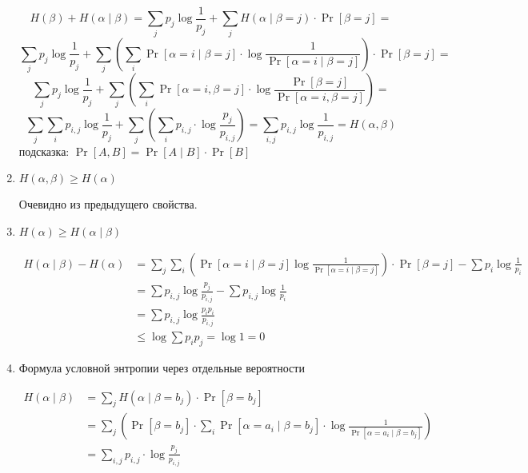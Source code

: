 \begin{prop}
\begin{enumerate}
\begin{proof*}
		    \[
    		    H( \beta ) + H( \alpha  \mid \beta ) = \sum_j p_j \log \frac{1}{p_j} + \sum_{j} H ( \alpha  \mid \beta = j) \cdot  \Pr[\beta = j] = \]\[ \sum_j p_j \log \frac{1}{p_j} + \sum_{j} \left(\sum_{i}^{} \Pr[ \alpha = i \mid  \beta  = j] \cdot  \log \frac{1}{\Pr [ \alpha  = i \mid \beta  = j]}\right) \cdot  \Pr[\beta = j] = 
		    \]
		    \[ 
		        \sum_j p_j \log \frac{1}{p_j} + \sum_{j} \left(\sum_{i}^{} \Pr[ \alpha = i,  \beta  = j] \cdot  \log \frac{\Pr [\beta = j]}{\Pr [ \alpha  = i,  \beta  = j]}\right) = 
		    \]
		     \[ 
		         \sum_j \sum_i p_{i,j} \log \frac{1}{p_j} + \sum_{j} \left(\sum_{i}^{} p_{i,j} \cdot  \log \frac{p_j}{p_{i,j}}\right) = \sum_{i,j}p_{i,j}\log \frac{1}{p_{i,j}} = H(\alpha, \beta)
		    \]
		    подсказка: $\Pr [A, B] = \Pr[A \mid B] \cdot \Pr[B]$
		\end{proof*}
		\item $ H( \alpha , \beta ) \ge H( \alpha )$
		\begin{proof*}
		    Очевидно из предыдущего свойства.
		\end{proof*}
		\item $ H( \alpha ) \ge  H ( \alpha \mid \beta )$
			\begin{proof*}
			    \begin{align*}
    			    H( \alpha \mid \beta ) - H ( \alpha ) 
    			    &= \sum_j \sum_i\left( \Pr [\alpha = i \mid \beta = j] \log \frac{1}{ \Pr [ \alpha = i \mid \beta = j]}\right)\cdot \Pr[\beta = j] - \sum p_{i} \log \frac{1}{p_i} \\
    				&= \sum p_{i,j}\log\frac{p_j}{p_{i,j}} - \sum p_{i,j}\log\frac{1}{p_i} \\
    				&= \sum p_{i, j} \log \frac{p_i p_i}{p_{i,j}} \\
    				&\le \log \sum p_i p_j = \log 1 = 0 \tag{по неравенству Йенсена}
			    \end{align*}
			\end{proof*}
		\item Формула условной энтропии через отдельные вероятности
		    \begin{proof*}
    			\begin{align*}
    				H( \alpha \mid \beta ) 
    				&= \sum_j H(\alpha \mid \beta = b_j) \cdot \Pr[\beta = b_j] \\
    				&= \sum_{j} \left( \Pr[ \beta = b_j] \cdot  \sum_{i}^{} \Pr[ \alpha = a_i \mid \beta = b_j] \cdot \log \frac{1}{\Pr[ \alpha = a_i \mid \beta = b_j]} \right) \\
    				&= \sum_{i, j}^{} p_{i,j} \cdot \log \frac{p_{j}}{p_{i, j}}

\end{align*}
\end{proof*}
\end{enumerate}
\end{prop}
